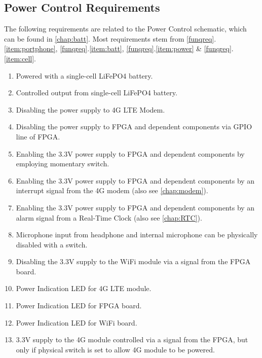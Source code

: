 \subsection{Power Control Requirements}
The following requirements are related to the Power Control schematic, which can be found in \autoref{chap:batt}.
Most requirements stem from \ref{funqreq}.\ref{item:portphone}, \ref{funqreq}.\ref{item:batt}, \ref{funqreq}.\ref{item:power} \& \ref{funqreq}.\ref{item:cell}.
\begin{enumerate}
\item Powered with a single-cell LiFePO4 battery.
\item Controlled output from single-cell LiFePO4 battery. 
\item Disabling the power supply to 4G LTE Modem.
\item Disabling the power supply to FPGA and dependent components via GPIO line of FPGA.
\item Enabling the 3.3V power supply to FPGA and dependent components by employing momentary switch.
\item Enabling the 3.3V power supply to FPGA and dependent components by an interrupt signal from the 4G modem (also see \autoref{chap:modem}).
\item Enabling the 3.3V power supply to FPGA and dependent components by an alarm signal from a Real-Time Clock (also see \autoref{chap:RTC}).
\item Microphone input from headphone and internal microphone can be physically disabled with a switch.
\item Disabling the 3.3V supply to the WiFi module via a signal from the FPGA board.
\item Power Indication LED for 4G LTE module.
\item Power Indication LED for FPGA board.
\item Power Indication LED for WiFi board.
\item 3.3V supply to the 4G module controlled via a signal from the FPGA, but only if physical switch is set to allow 4G module to be powered.
\end{enumerate}

